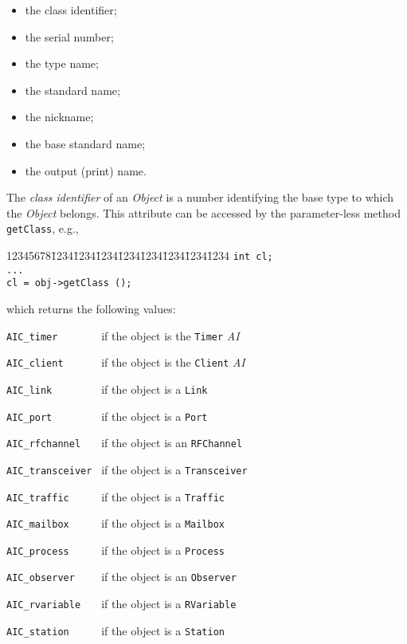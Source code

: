 \begin{itemize}
\item
the class identifier;
\item
the serial number;
\item
the type name;
\item
the standard name;
\item
the nickname;
\item
the base standard name;
\item
the output (print) name.
\end{itemize}

The {\em class identifier\/} of an {\em Object\/} is a number
identifying the base {\smurph}
type to which the {\em Object\/} belongs.
This attribute can be accessed by the parameter-less method
{\tt getClass}, e.g.,
{\tt\begin{tabbing}
12345678\=1234\=1234\=1234\=1234\=1234\=1234\=1234\=1234\kill
\> {\tt int  cl;}\\
\> {\tt ...}\\
\> {\tt cl = obj->getClass ();}
\end{tabbing}}
\noindent
which returns the following values:

\bigskip

\noindent
{\tt AIC\_timer~~~~~~~} if the object is the {\tt Timer} {\em AI}

\noindent
{\tt AIC\_client~~~~~~} if the object is the {\tt Client} {\em AI}

\noindent
{\tt AIC\_link~~~~~~~~} if the object is a {\tt Link}

\noindent
{\tt AIC\_port~~~~~~~~} if the object is a {\tt Port}

\noindent
{\tt AIC\_rfchannel~~~} if the object is an {\tt RFChannel}

\noindent
{\tt AIC\_transceiver~} if the object is a {\tt Transceiver}

\noindent
{\tt AIC\_traffic~~~~~} if the object is a {\tt Traffic}

\noindent
{\tt AIC\_mailbox~~~~~} if the object is a {\tt Mailbox}

\noindent
{\tt AIC\_process~~~~~} if the object is a {\tt Process}

\noindent
{\tt AIC\_observer~~~~} if the object is an {\tt Observer}

\noindent
{\tt AIC\_rvariable~~~} if the object is a {\tt RVariable}

\noindent
{\tt AIC\_station~~~~~} if the object is a {\tt Station}


